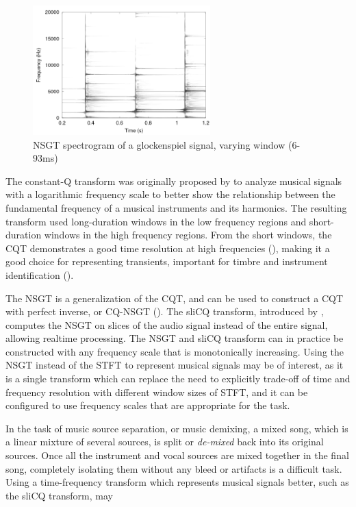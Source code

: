 \documentclass[report.tex]{subfiles}
\begin{document}
\begin{figure}[ht]
	\centering
	\includegraphics[height=5cm]{./images-tftheory/tf_tradeoff_balasz3.png}
	\caption{NSGT spectrogram of a glockenspiel signal, varying window (6-93ms)}
	\label{fig:nsgttradeoff}
\end{figure}

The constant-Q transform was originally proposed by \textcite{jbrown} to analyze musical signals with a logarithmic frequency scale to better show the relationship between the fundamental frequency of a musical instruments and its harmonics. The resulting transform used long-duration windows in the low frequency regions and short-duration windows in the high frequency regions. From the short windows, the CQT demonstrates a good time resolution at high frequencies (\cite{cqtransient}), making it a good choice for representing transients, important for timbre and instrument identification (\cite{timbretransients1, timbretransients2}).

The NSGT is a generalization of the CQT, and can be used to construct a CQT with perfect inverse, or CQ-NSGT (\cite{invertiblecqt, variableq1}). The sliCQ transform, introduced by \textcite{invertiblecqt}, computes the NSGT on slices of the audio signal instead of the entire signal, allowing realtime processing. The NSGT and sliCQ transform can in practice be constructed with any frequency scale that is monotonically increasing. Using the NSGT instead of the STFT to represent musical signals may be of interest, as it is a single transform which can replace the need to explicitly trade-off of time and frequency resolution with different window sizes of STFT, and it can be configured to use frequency scales that are appropriate for the task.

In the task of music source separation, or music demixing, a mixed song, which is a linear mixture of several sources, is split or \textit{de-mixed} back into its original sources. Once all the instrument and vocal sources are mixed together in the final song, completely isolating them without any bleed or artifacts is a difficult task. Using a time-frequency transform which represents musical signals better, such as the sliCQ transform, may
\end{document}
